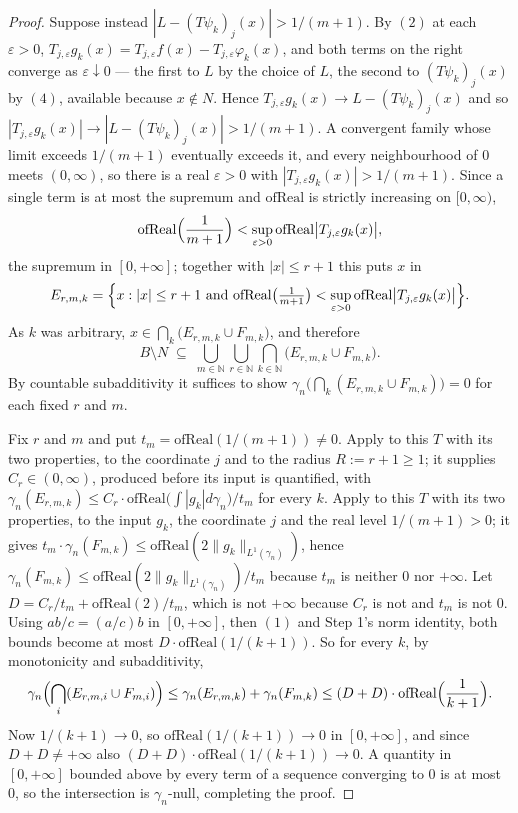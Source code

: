 \begin{proof}
Suppose instead $|L - (T\psi_k)_j(x)| > 1/(m+1)$.  By $(2)$ at each
$\varepsilon > 0$, $T_{j,\varepsilon}g_k(x)
 = T_{j,\varepsilon}f(x) - T_{j,\varepsilon}\varphi_k(x)$, and both terms on
the right converge as $\varepsilon \downarrow 0$ --- the first to $L$ by the
choice of $L$, the second to $(T\psi_k)_j(x)$ by $(4)$, available because
$x \notin N$.  Hence $T_{j,\varepsilon}g_k(x) \to L - (T\psi_k)_j(x)$ and so
$|T_{j,\varepsilon}g_k(x)| \to |L - (T\psi_k)_j(x)| > 1/(m+1)$.  A convergent
family whose limit exceeds $1/(m+1)$ eventually exceeds it, and every
neighbourhood of $0$ meets $(0,\infty)$, so there is a real $\varepsilon > 0$
with $|T_{j,\varepsilon}g_k(x)| > 1/(m+1)$.  Since a single term is at most the
supremum and $\mathrm{ofReal}$ is strictly increasing on $[0,\infty)$,
\[
  \mathrm{ofReal}\Bigl(\frac1{m+1}\Bigr)
    < \sup_{\varepsilon>0}\mathrm{ofReal}
      \bigl|T_{j,\varepsilon}g_k(x)\bigr| ,
\]
the supremum in $[0,+\infty]$; together with $|x| \leq r+1$ this puts $x$ in
\[
  E_{r,m,k} = \Bigl\{x : |x| \leq r+1 \text{ and }
    \mathrm{ofReal}\bigl(\tfrac1{m+1}\bigr)
      < \sup_{\varepsilon>0}\mathrm{ofReal}\bigl|T_{j,\varepsilon}g_k(x)\bigr|
  \Bigr\} .
\]
As $k$ was arbitrary,
$x \in \bigcap_{k}\bigl(E_{r,m,k} \cup F_{m,k}\bigr)$, and therefore
\[
  B \setminus N \;\subseteq\;
    \bigcup_{m\in\mathbb{N}}\bigcup_{r\in\mathbb{N}}
      \bigcap_{k\in\mathbb{N}}\bigl(E_{r,m,k} \cup F_{m,k}\bigr) .
\]
By countable subadditivity it suffices to show
$\gamma_n\bigl(\bigcap_k(E_{r,m,k} \cup F_{m,k})\bigr) = 0$ for each fixed $r$
and $m$.

Fix $r$ and $m$ and put $t_m = \mathrm{ofReal}(1/(m+1)) \neq 0$.  Apply
 to this $T$ with its two properties, to
the coordinate $j$ and to the radius $R := r+1 \geq 1$; it supplies
$C_r \in (0,\infty)$, produced before its input is quantified, with
$\gamma_n(E_{r,m,k}) \leq C_r\cdot\mathrm{ofReal}\bigl(\int|g_k|d\gamma_n\bigr)/t_m$
for every $k$.  Apply  to this $T$ with its two
properties, to the input $g_k$, the coordinate $j$ and the real level
$1/(m+1) > 0$; it gives
$t_m\cdot\gamma_n(F_{m,k}) \leq \mathrm{ofReal}(2\|g_k\|_{L^1(\gamma_n)})$,
hence $\gamma_n(F_{m,k}) \leq
 \mathrm{ofReal}(2\|g_k\|_{L^1(\gamma_n)})/t_m$ because $t_m$ is neither $0$
nor $+\infty$.  Let
$D = C_r/t_m + \mathrm{ofReal}(2)/t_m$, which is not $+\infty$ because $C_r$ is
not and $t_m$ is not $0$.  Using $ab/c = (a/c)b$ in $[0,+\infty]$, then $(1)$
and Step 1's norm identity, both bounds become at most
$D\cdot\mathrm{ofReal}(1/(k+1))$.  So for every $k$, by monotonicity and
subadditivity,
\[
  \gamma_n\Bigl(\bigcap_{i}(E_{r,m,i} \cup F_{m,i})\Bigr)
    \leq \gamma_n(E_{r,m,k}) + \gamma_n(F_{m,k})
    \leq (D + D)\cdot\mathrm{ofReal}\Bigl(\frac1{k+1}\Bigr) .
\]
Now $1/(k+1) \to 0$, so $\mathrm{ofReal}(1/(k+1)) \to 0$ in $[0,+\infty]$, and
since $D + D \neq +\infty$ also $(D+D)\cdot\mathrm{ofReal}(1/(k+1)) \to 0$.  A
quantity in $[0,+\infty]$ bounded above by every term of a sequence converging
to $0$ is at most $0$, so the intersection is $\gamma_n$-null, completing the
proof.
\end{proof}
